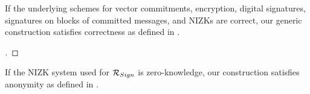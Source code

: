 \begin{theorem}
  \label{thm:correctness-uas}
  If the underlying schemes for vector commitments, encryption, digital
  signatures, signatures on blocks of committed messages, and NIZKs are
  correct, our generic construction \CUASGen satisfies correctness as
  defined in .
\end{theorem}

\begin{proof}[]
\end{proof}

\begin{theorem}
  \label{thm:anonymity-uas}
  If the NIZK system used for $\mathcal{R}_{Sign}$ is zero-knowledge, our
  \CUASGen construction satisfies anonymity as defined in
  .
\end{theorem}

